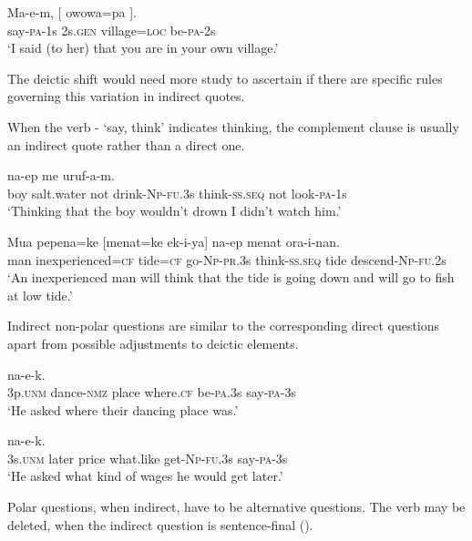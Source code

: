 \ea%
\label{ex:x1266}
\gll Ma-e-m,  [ \textstyleEmphasizedVernacularWords{} owowa=pa  ]. \\
say-\textsc{pa}-1s 2s.\textsc{gen} village=\textsc{loc} be-\textsc{pa}-2s\\
\glt`I said (to her) that you are in your own village.'
\z


The deictic shift would need more study to ascertain if there are specific rules governing this variation in indirect quotes.

When the verb - `say, think' indicates thinking, the complement clause is usually an indirect quote rather than a direct one. 

\ea%
\label{ex:x1588}
 na-ep  me  uruf-a-m.\\
boy  salt.water  not  drink-\textsc{Np}-\textsc{fu}.3s think-\textsc{ss}.\textsc{seq} not look-\textsc{pa}-1s\\
\glt`Thinking that the boy wouldn't drown I didn't watch him.'
\z


\ea%
\label{ex:x1589}
\gll Mua  pepena=ke  [menat=ke  ek-i-ya]  na-ep menat  ora-i-nan.\\
man  inexperienced=\textsc{cf} tide=\textsc{cf} go-\textsc{Np}-\textsc{pr}.3s think-\textsc{ss}.\textsc{seq} tide descend-\textsc{Np}-\textsc{fu}.2s\\
\glt`An inexperienced man will think that the tide is going down and will go to fish at low tide.'
\z


Indirect non-polar questions are similar to the corresponding direct questions apart from possible adjustments to deictic elements.

\ea%
\label{ex:x1592}
  na-e-k.\\
3p.\textsc{unm} dance-\textsc{nmz} place where.\textsc{cf} be-\textsc{pa}.3s say-\textsc{pa}-3s\\
\glt`He asked where their dancing place was.'
\z


\ea%
\label{ex:x1590}
  na-e-k.\\
3s.\textsc{unm} later  price  what.like  get-\textsc{Np}-\textsc{fu}.3s  say-\textsc{pa}-3s\\
\glt`He asked what kind of wages he would get later.'
\z


Polar questions, when indirect, have to be alternative questions. The verb  may be deleted, when the indirect question is sentence-final (). 


